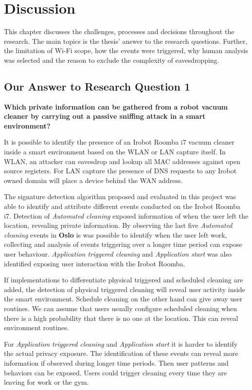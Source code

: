 \chapter{Discussion}
This chapter discusses the challenges, processes and decisions throughout the research. The main topics is the thesis' answer to the research questions. Further, the limitation of \gls{Wi-Fi} scope, how the events were triggered, why human analysis was selected and the reason to exclude the complexity of eavesdropping. 

\section{Our Answer to Research Question 1}
\textbf{Which private information can be gathered from a robot vacuum cleaner by carrying out a passive sniffing attack in a smart environment?}

It is possible to identify the presence of an Irobot Roomba i7 vacuum cleaner inside a smart environment based on the \gls{WLAN} or \gls{LAN} capture itself. In \gls{WLAN}, an attacker can eavesdrop and lookup all  \gls{MAC} addresses against open source registers. For \gls{LAN} capture the presence of \gls{DNS} requests to any Irobot owned domain will place a device behind the \gls{WAN} address.

The signature detection algorithm proposed and evaluated in this project was able to identify and attribute different events conducted on the Irobot Roomba i7. Detection of \textit{Automated cleaning} exposed information of when the user left the location, revealing private information. By observing the last five \textit{Automated cleaning} events in \textbf{Oslo} is was possible to identify when the user left work, collecting and analysis of events triggering over a longer time period can expose user behaviour. \textit{Application triggered cleaning} and \textit{Application start} was also identified exposing user interaction with the Irobot Roomba.

If implementations to differentiate physical triggered and scheduled cleaning are added, the detection of physical triggered cleaning will reveal user activity inside the smart environment. Schedule cleaning on the other hand can give away user routines. We can assume that users usually configure scheduled cleaning when there is a high probability that there is no one at the location. This can reveal environment routines. 

For \textit{Application triggered cleaning} and \textit{Application start} it is harder to identify the actual privacy exposure. The identification of these events can reveal more information if observed during longer time periods. Then user patterns and behaviors can be exposed. Users could trigger cleaning every time they are leaving for work or the gym.

